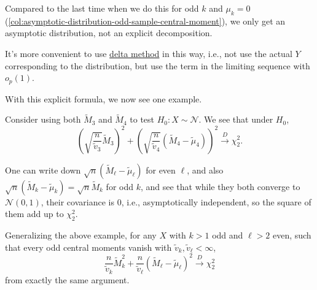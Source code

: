 Compared to the last time  when we do this for odd \(k\) and \(\mu _k = 0\) (\autoref{col:asymptotic-distribution-odd-sample-central-moment}), we only get an asymptotic distribution, not an explicit decomposition.

\begin{note}
	It's more convenient to use \hyperref[thm:delta-method]{delta method} in this way, i.e., not use the actual \(Y\) corresponding to the distribution, but use the term in the limiting sequence with \(o_p(1)\).
\end{note}

With this explicit formula, we now see one example.

\begin{eg}
	Consider using both \(\widetilde{M} _3\) and \(\widetilde{M} _4\) to test \(H_0\colon X \sim \mathcal{N} \). We see that under \(H_0\),
	\[
		\left( \sqrt{\frac{n}{\widetilde{v} _3}} \widetilde{M} _3 \right) ^2 + \left( \sqrt{\frac{n}{\widetilde{v} _4}} (\widetilde{M} _4 - \widetilde{\mu} _4) \right) ^2
		\overset{D}{\to} \chi _2^2 .
	\]
\end{eg}
\begin{explanation}
	One can write down \(\sqrt{n} (\widetilde{M} _\ell - \widetilde{\mu} _\ell )\) for even \(\ell \), and also \(\sqrt{n} (\widetilde{M} _k - \widetilde{\mu} _k)= \sqrt{n} \widetilde{M} _k\) for odd \(k\), and see that while they both converge to \(\mathcal{N} (0, 1)\), their covariance is \(0\), i.e., asymptotically independent, so the square of them add up to \(\chi _2^2\).
\end{explanation}

Generalizing the above example, for any \(X\) with \(k > 1\) odd and \(\ell > 2\) even, such that every odd central moments vanish with \(\widetilde{v} _k , \widetilde{v} _\ell < \infty \),
\[
	\frac{n}{\widetilde{v} _k} \widetilde{M} _k^2 + \frac{n}{\widetilde{v} _\ell }(\widetilde{M} _\ell - \widetilde{\mu} _\ell )^2 \overset{D}{\to} \chi _2^2
\]
from exactly the same argument.

